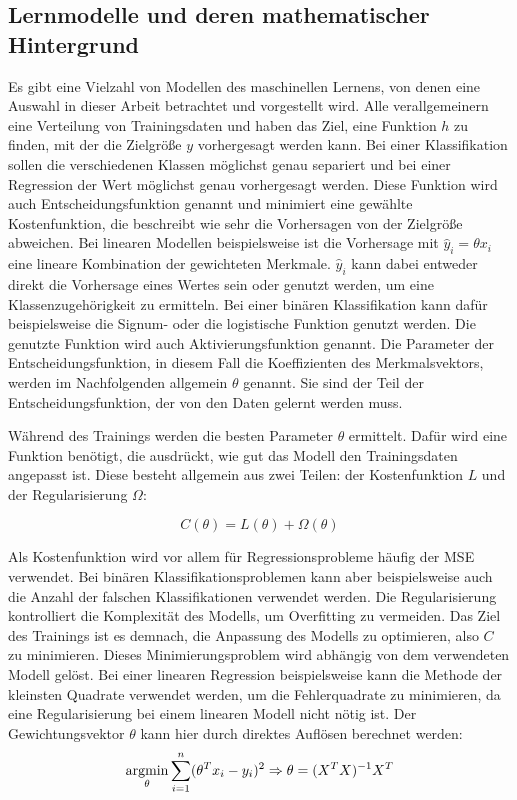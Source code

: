 	\subsection{Lernmodelle und deren mathematischer Hintergrund}
	
		Es gibt eine Vielzahl von Modellen des maschinellen Lernens, von denen eine Auswahl in dieser Arbeit betrachtet und vorgestellt wird. Alle verallgemeinern eine Verteilung von Trainingsdaten und haben das Ziel, eine Funktion $h$ zu finden, mit der die Zielgröße $y$ vorhergesagt werden kann. Bei einer Klassifikation sollen die verschiedenen Klassen möglichst genau separiert und bei einer Regression der Wert möglichst genau vorhergesagt werden. Diese Funktion wird auch Entscheidungsfunktion genannt und minimiert eine gewählte Kostenfunktion, die beschreibt wie sehr die Vorhersagen von der Zielgröße abweichen. Bei linearen Modellen beispielsweise ist die Vorhersage mit $\hat{y}_i = \theta x_i$ eine lineare Kombination der gewichteten Merkmale. $\hat{y}_i$ kann dabei entweder direkt die Vorhersage eines Wertes sein oder genutzt werden, um eine Klassenzugehörigkeit zu ermitteln. Bei einer binären Klassifikation kann dafür beispielsweise die Signum- oder die logistische Funktion genutzt werden. Die genutzte Funktion wird auch Aktivierungsfunktion genannt. Die Parameter der Entscheidungsfunktion, in diesem Fall die Koeffizienten des Merkmalsvektors, werden im Nachfolgenden allgemein $\theta$ genannt. Sie sind der Teil der Entscheidungsfunktion, der von den Daten gelernt werden muss.
		
		Während des Trainings werden die besten Parameter $\theta$ ermittelt. Dafür wird eine Funktion benötigt, die ausdrückt, wie gut das Modell den Trainingsdaten angepasst ist. Diese besteht allgemein aus zwei Teilen: der Kostenfunktion $L$ und der Regularisierung $\Omega$:
		
		\[
			C(\theta)= L(\theta) + \Omega(\theta)
		\]
		
		Als Kostenfunktion wird vor allem für Regressionsprobleme häufig der \ac{MSE} verwendet. Bei binären Klassifikationsproblemen kann aber beispielsweise auch die Anzahl der falschen Klassifikationen verwendet werden. Die Regularisierung kontrolliert die Komplexität des Modells, um Overfitting zu vermeiden. Das Ziel des Trainings ist es demnach, die Anpassung des Modells zu optimieren, also $C$ zu minimieren. Dieses Minimierungsproblem wird abhängig von dem verwendeten Modell gelöst. Bei einer linearen Regression beispielsweise kann die Methode der kleinsten Quadrate verwendet werden, um die Fehlerquadrate zu minimieren, da eine Regularisierung bei einem linearen Modell nicht nötig ist. Der Gewichtungsvektor $\theta$ kann hier durch direktes Auflösen berechnet werden:
		\[
			\operatorname*{argmin}_{\theta} \sum_{i=1}^{n} (\theta^T x_i - y_i)^2
			\Rightarrow \theta = (X^T X)^{-1} X^T
		\]
		
